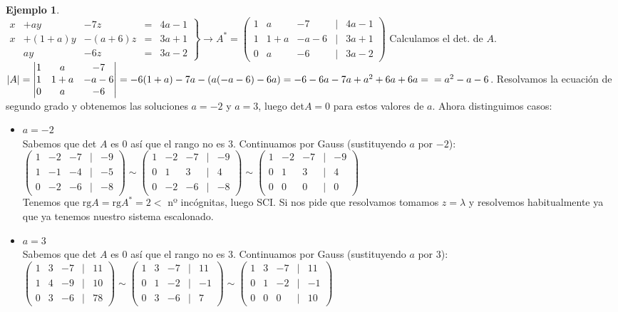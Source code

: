 \documentclass[11pt, oneside]{book}
\theoremstyle{definition} %
\newtheorem{ejem}{Ejemplo}
\newcommand{\deter}[1]{\left| \begin{matrix} #1	\end{matrix}\right|}
\newcommand{\rg}{\mathrm{rg}}
\begin{document}
\begin{ejem}\ \\
$\left. \begin{matrix} x & +ay & -7z & = &4a-1\\
x& +(1+a)y & -(a+6)z & = &3a+1\\
 & ay & -6z & = &3a-2 \end{matrix}\right\}\longrightarrow A^*= \begin{pmatrix} 1&a&-7&|&4a-1\\1&1+a&-a-6&|&3a+1\\0&a&-6&|&3a-2\end{pmatrix}$ Calculamos el det. de $A$.\\
$|A|=\deter{1&a&-7\\1&1+a&-a-6\\0&a&-6}=-6(1+a)-7a-(a(-a-6)-6a)=-6-6a-7a+a^2+6a+6a=\\=a^2-a-6$. Resolvamos la ecuación de segundo grado y obtenemos las soluciones $a=-2$ y $a=3$, luego det$A=0$ para estos valores de $a$. Ahora distinguimos casos:
\begin{itemize}
	\item $a=-2$\\
	Sabemos que det $A$ es $0$ así que el rango no es $3$. Continuamos por Gauss (sustituyendo $a$ por $-2$):\\
	$\begin{pmatrix} 1&-2&-7&|&-9\\1&-1&-4&|&-5\\0&-2&-6&|&-8\end{pmatrix}\sim \begin{pmatrix} 1&-2&-7&|&-9\\0&1&3&|&4\\0&-2&-6&|&-8\end{pmatrix}\sim\begin{pmatrix} 1&-2&-7&|&-9\\0&1&3&|&4\\0&0&0&|&0\end{pmatrix}$\\
	Tenemos que $\rg{A}=\rg{A^*}=2<$ nº incógnitas, luego SCI. Si nos pide que resolvamos tomamos $z=\lambda$ y resolvemos habitualmente ya que ya tenemos nuestro sistema escalonado.
	\item $a=3$\\
	Sabemos que det $A$ es $0$ así que el rango no es $3$. Continuamos por Gauss (sustituyendo $a$ por $3$):\\
	$\begin{pmatrix} 1&3&-7&|&11\\1&4&-9&|&10\\0&3&-6&|&78\end{pmatrix}\sim\begin{pmatrix} 1&3&-7&|&11\\0&1&-2&|&-1\\0&3&-6&|&7\end{pmatrix}\sim\begin{pmatrix} 1&3&-7&|&11\\0&1&-2&|&-1\\0&0&0&|&10\end{pmatrix}$\\

\end{itemize}
\end{ejem}
\end{document}
